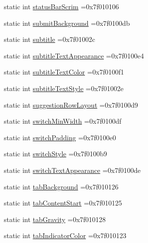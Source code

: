 \begin{DoxyCompactItemize}
static int \hyperlink{classandroid_1_1support_1_1design_1_1R_1_1attr_a676b0bc448d5a54602f309542f409713}{status\+Bar\+Scrim} =0x7f010106
\item 
static int \hyperlink{classandroid_1_1support_1_1design_1_1R_1_1attr_aed7a9a95b5ca3a84d2d0d0b5d7cba82b}{submit\+Background} =0x7f0100db
\item 
static int \hyperlink{classandroid_1_1support_1_1design_1_1R_1_1attr_a977d337b4627b48ff54cc6b947c7e7ca}{subtitle} =0x7f01002c
\item 
static int \hyperlink{classandroid_1_1support_1_1design_1_1R_1_1attr_a98ff73280c3e52b8adee36f97a9dd329}{subtitle\+Text\+Appearance} =0x7f0100e4
\item 
static int \hyperlink{classandroid_1_1support_1_1design_1_1R_1_1attr_acdc80a288896de3528fa898e7c23a687}{subtitle\+Text\+Color} =0x7f0100f1
\item 
static int \hyperlink{classandroid_1_1support_1_1design_1_1R_1_1attr_a2d8877abb4f0cd5569d1e413558667b7}{subtitle\+Text\+Style} =0x7f01002e
\item 
static int \hyperlink{classandroid_1_1support_1_1design_1_1R_1_1attr_ad909aebf0409cf0d4e1a58e44ddf7248}{suggestion\+Row\+Layout} =0x7f0100d9
\item 
static int \hyperlink{classandroid_1_1support_1_1design_1_1R_1_1attr_a91b9eeca090178e16f54c7a9103bb7b9}{switch\+Min\+Width} =0x7f0100df
\item 
static int \hyperlink{classandroid_1_1support_1_1design_1_1R_1_1attr_af3e0cfcf4fb4ee5950b8df4042cf6d06}{switch\+Padding} =0x7f0100e0
\item 
static int \hyperlink{classandroid_1_1support_1_1design_1_1R_1_1attr_a80507bb157d6c92971b9182db9cb6f3a}{switch\+Style} =0x7f0100b9
\item 
static int \hyperlink{classandroid_1_1support_1_1design_1_1R_1_1attr_ac71231e27777af35142128f3a2243b31}{switch\+Text\+Appearance} =0x7f0100de
\item 
static int \hyperlink{classandroid_1_1support_1_1design_1_1R_1_1attr_a0d6b5d1f9567a7ffe9de602efc8133f4}{tab\+Background} =0x7f010126
\item 
static int \hyperlink{classandroid_1_1support_1_1design_1_1R_1_1attr_a6f43be6856c3cd04f1b3ea14fc2cc302}{tab\+Content\+Start} =0x7f010125
\item 
static int \hyperlink{classandroid_1_1support_1_1design_1_1R_1_1attr_aa49ae8d39f1825bc91c6650270a48781}{tab\+Gravity} =0x7f010128
\item 
static int \hyperlink{classandroid_1_1support_1_1design_1_1R_1_1attr_a5834056dea54e9c078fdc6ac6b59f3b9}{tab\+Indicator\+Color} =0x7f010123

\end{DoxyCompactItemize}
